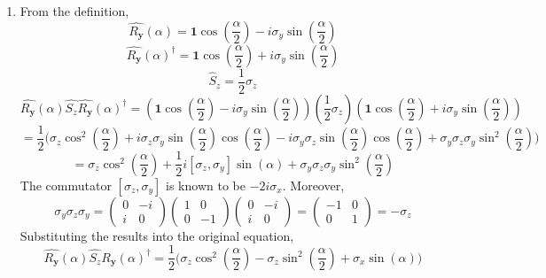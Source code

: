 \begin{sol}
\begin{enumerate}[label=\textbf{(\alph*)}]
\item
From the definition, 
\begin{equation}
	\hat{R_\mathbf{y}}(\alpha)=\mathbf{1}\cos(\frac{\alpha}{2})-i\sigma_y\sin(\frac{\alpha}{2})
\end{equation}
\begin{equation}
	\hat{R_\mathbf{y}}(\alpha)^\dagger=\mathbf{1}\cos(\frac{\alpha}{2})+i\sigma_y\sin(\frac{\alpha}{2})
\end{equation}
\begin{equation}
	\hat{S}_z=\frac{1}{2}\sigma_z
\end{equation} \begin{equation}
	\hat{R_\mathbf{y}}(\alpha)\hat{S_z}\hat{R_\mathbf{y}}(\alpha)^\dagger=(\mathbf{1}\cos(\frac{\alpha}{2})-i\sigma_y\sin(\frac{\alpha}{2}))(\frac{1}{2}\sigma_z)(\mathbf{1}\cos(\frac{\alpha}{2})+i\sigma_y\sin(\frac{\alpha}{2}))
\end{equation} \begin{equation}
	=\frac{1}{2}\Big(\sigma_z\cos^2(\frac{\alpha}{2})+i\sigma_z\sigma_y\sin(\frac{\alpha}{2})\cos(\frac{\alpha}{2})-i\sigma_y\sigma_z\sin(\frac{\alpha}{2})\cos(\frac{\alpha}{2})+\sigma_y\sigma_z\sigma_y\sin^2(\frac{\alpha}{2})\Big)
\end{equation}
\begin{equation}
	=\sigma_z\cos^2(\frac{\alpha}{2})+\frac{1}{2}i[\sigma_z,\sigma_y]\sin(\alpha)+\sigma_y\sigma_z\sigma_y\sin^2(\frac{\alpha}{2})
\end{equation}
The commutator $[\sigma_z,\sigma_y]$ is known to be $-2i\sigma_x$. Moreover,
\begin{equation}
	\sigma_y\sigma_z\sigma_y=\begin{pmatrix}0&-i\\i&0\end{pmatrix}\begin{pmatrix}1&0\\0&-1\end{pmatrix}\begin{pmatrix}0&-i\\i&0\end{pmatrix}=\begin{pmatrix}-1&0\\0&1\end{pmatrix}=-\sigma_z
\end{equation} 
Substituting the results into the original equation,
\begin{equation}
	\hat{R_\mathbf{y}}(\alpha)\hat{S_z}\hat{R_\mathbf{y}}(\alpha)^\dagger=\frac{1}{2}\Big(\sigma_z\cos^2(\frac{\alpha}{2})-\sigma_z\sin^2(\frac{\alpha}{2})+\sigma_x\sin(\alpha)\Big)

\end{equation}
\end{enumerate}
\end{sol}
